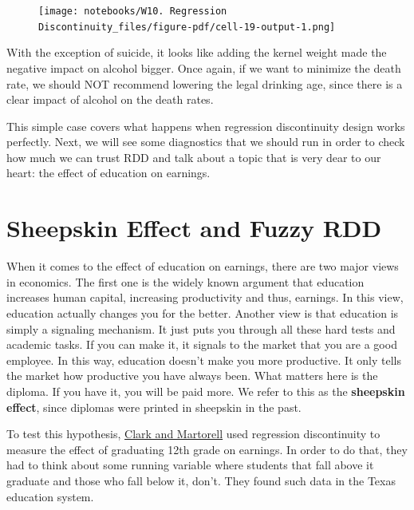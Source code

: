 \documentclass[
  letterpaper,
  DIV=11,
  numbers=noendperiod]{scrreprt}
\begin{document}
\begin{figure}[H]

{\centering \texttt{[image: notebooks/W10. Regression Discontinuity\_files/figure-pdf/cell-19-output-1.png]}

}

\end{figure}

With the exception of suicide, it looks like adding the kernel weight
made the negative impact on alcohol bigger. Once again, if we want to
minimize the death rate, we should NOT recommend lowering the legal
drinking age, since there is a clear impact of alcohol on the death
rates.

This simple case covers what happens when regression discontinuity
design works perfectly. Next, we will see some diagnostics that we
should run in order to check how much we can trust RDD and talk about a
topic that is very dear to our heart: the effect of education on
earnings.

\hypertarget{sheepskin-effect-and-fuzzy-rdd}{%
\section{Sheepskin Effect and Fuzzy
RDD}\label{sheepskin-effect-and-fuzzy-rdd}}

When it comes to the effect of education on earnings, there are two
major views in economics. The first one is the widely known argument
that education increases human capital, increasing productivity and
thus, earnings. In this view, education actually changes you for the
better. Another view is that education is simply a signaling mechanism.
It just puts you through all these hard tests and academic tasks. If you
can make it, it signals to the market that you are a good employee. In
this way, education doesn't make you more productive. It only tells the
market how productive you have always been. What matters here is the
diploma. If you have it, you will be paid more. We refer to this as the
\textbf{sheepskin effect}, since diplomas were printed in sheepskin in
the past.

To test this hypothesis,
\href{https://faculty.smu.edu/millimet/classes/eco7321/papers/clark\%20martorell\%202014.pdf}{Clark
and Martorell} used regression discontinuity to measure the effect of
graduating 12th grade on earnings. In order to do that, they had to
think about some running variable where students that fall above it
graduate and those who fall below it, don't. They found such data in the
Texas education system.
\end{document}
